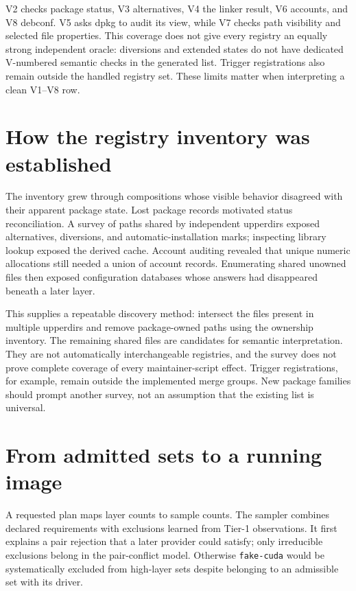 V2 checks package status, V3 alternatives, V4 the linker result, V6 accounts, and V8 debconf. V5 asks dpkg to audit its view, while V7 checks path visibility and selected file properties. This coverage does not give every registry an equally strong independent oracle: diversions and extended states do not have dedicated V-numbered semantic checks in the generated list. Trigger registrations also remain outside the handled registry set. These limits matter when interpreting a clean V1--V8 row.

\section{How the registry inventory was established}
\label{sec:arch:discovery}

The inventory grew through compositions whose visible behavior disagreed with their apparent package state. Lost package records motivated status reconciliation. A survey of paths shared by independent upperdirs exposed alternatives, diversions, and automatic-installation marks; inspecting library lookup exposed the derived cache. Account auditing revealed that unique numeric allocations still needed a union of account records. Enumerating shared unowned files then exposed configuration databases whose answers had disappeared beneath a later layer.

This supplies a repeatable discovery method: intersect the files present in multiple upperdirs and remove package-owned paths using the ownership inventory. The remaining shared files are candidates for semantic interpretation. They are not automatically interchangeable registries, and the survey does not prove complete coverage of every maintainer-script effect. Trigger registrations, for example, remain outside the implemented merge groups. New package families should prompt another survey, not an assumption that the existing list is universal.

\section{From admitted sets to a running image}
\label{sec:arch:running}

A requested plan maps layer counts to sample counts. The sampler combines declared requirements with exclusions learned from Tier-1 observations. It first explains a pair rejection that a later provider could satisfy; only irreducible exclusions belong in the pair-conflict model. Otherwise \texttt{fake-cuda} would be systematically excluded from high-layer sets despite belonging to an admissible set with its driver.

